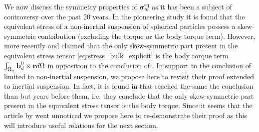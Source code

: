 We now discuss the symmetry properties of $\bm\sigma^\text{eq}_m$ as it has been a subject of controversy over the past 20 years.
In the pioneering study  \citep{prosperetti2006stress} it is found that the equivalent stress of a non-inertial suspension of spherical particles possess a skew-symmetric contribution (excluding the torque or the body torque term). 
However, more recently \citet{zhou2020lamb} and \citet{dolata2020heterogeneous} claimed that the only skew-symmetric part present in the equivalent stress tensor \eqref{eq:stress_bulk_explicit} is the body torque term $\int_{\Omega_\alpha} \textbf{b}_d^0 \times \textbf{r} d\Omega$ in opposition to the conclusion of \citep{prosperetti2006stress}.
In support to the conclusion of  \citet{dolata2020heterogeneous} limited to non-inertial suspension, we propose here to revisit their proof extended to inertial suspension. 
In fact, it is found in \citet{lhuillier1996contribution} that reached the same the conclusion than \citet{dolata2020heterogeneous} but years before them, i.e. they conclude that the only skew-symmetric part present in the equivalent stress tensor is the body torque. 
Since it seems that the article by \citet{lhuillier1996contribution} went unnoticed we propose here to re-demonstrate their proof as this will introduce useful relations for the next section. 

